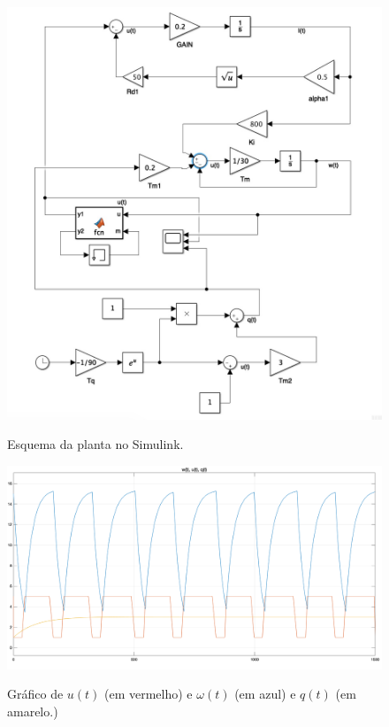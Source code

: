 \documentclass[11pt]{article}
\begin{document}
\begin{figure}[H]
	\centering
	{\includegraphics[width=\textwidth]
		{assets/q4_c_control_schema.jpg}}
	\caption{Esquema da planta no Simulink.}
\end{figure}

\begin{figure}[H]
	\centering
	{\includegraphics[width=\textwidth]
		{assets/q4_c_plot.png}}
	\caption{Gráfico de $u(t)$ (em vermelho) e $\omega(t)$ (em azul) e $q(t)$ (em amarelo.)}
\end{figure}
\end{document}
